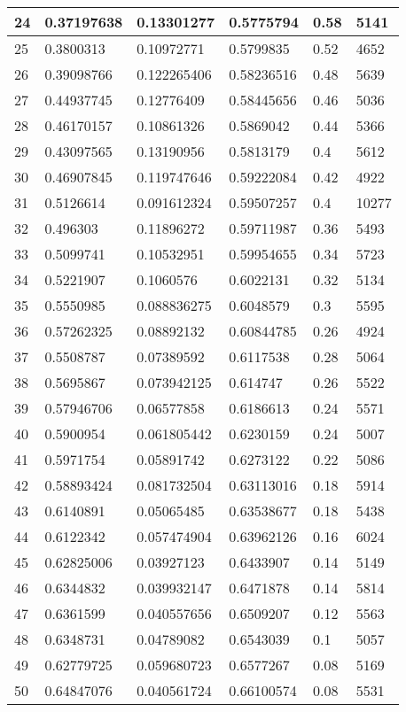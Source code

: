 \begin{longtable}{|l|l|l|l|l|l|}
24 & 0.37197638 & 0.13301277 & 0.5775794 & 0.58 & 5141 \\ \hline 
25 & 0.3800313 & 0.10972771 & 0.5799835 & 0.52 & 4652 \\ \hline 
26 & 0.39098766 & 0.122265406 & 0.58236516 & 0.48 & 5639 \\ \hline 
27 & 0.44937745 & 0.12776409 & 0.58445656 & 0.46 & 5036 \\ \hline 
28 & 0.46170157 & 0.10861326 & 0.5869042 & 0.44 & 5366 \\ \hline 
29 & 0.43097565 & 0.13190956 & 0.5813179 & 0.4 & 5612 \\ \hline 
30 & 0.46907845 & 0.119747646 & 0.59222084 & 0.42 & 4922 \\ \hline 
31 & 0.5126614 & 0.091612324 & 0.59507257 & 0.4 & 10277 \\ \hline 
32 & 0.496303 & 0.11896272 & 0.59711987 & 0.36 & 5493 \\ \hline 
33 & 0.5099741 & 0.10532951 & 0.59954655 & 0.34 & 5723 \\ \hline 
34 & 0.5221907 & 0.1060576 & 0.6022131 & 0.32 & 5134 \\ \hline 
35 & 0.5550985 & 0.088836275 & 0.6048579 & 0.3 & 5595 \\ \hline 
36 & 0.57262325 & 0.08892132 & 0.60844785 & 0.26 & 4924 \\ \hline 
37 & 0.5508787 & 0.07389592 & 0.6117538 & 0.28 & 5064 \\ \hline 
38 & 0.5695867 & 0.073942125 & 0.614747 & 0.26 & 5522 \\ \hline 
39 & 0.57946706 & 0.06577858 & 0.6186613 & 0.24 & 5571 \\ \hline 
40 & 0.5900954 & 0.061805442 & 0.6230159 & 0.24 & 5007 \\ \hline 
41 & 0.5971754 & 0.05891742 & 0.6273122 & 0.22 & 5086 \\ \hline 
42 & 0.58893424 & 0.081732504 & 0.63113016 & 0.18 & 5914 \\ \hline 
43 & 0.6140891 & 0.05065485 & 0.63538677 & 0.18 & 5438 \\ \hline 
44 & 0.6122342 & 0.057474904 & 0.63962126 & 0.16 & 6024 \\ \hline 
45 & 0.62825006 & 0.03927123 & 0.6433907 & 0.14 & 5149 \\ \hline 
46 & 0.6344832 & 0.039932147 & 0.6471878 & 0.14 & 5814 \\ \hline 
47 & 0.6361599 & 0.040557656 & 0.6509207 & 0.12 & 5563 \\ \hline 
48 & 0.6348731 & 0.04789082 & 0.6543039 & 0.1 & 5057 \\ \hline 
49 & 0.62779725 & 0.059680723 & 0.6577267 & 0.08 & 5169 \\ \hline 
50 & 0.64847076 & 0.040561724 & 0.66100574 & 0.08 & 5531 \\ \hline 
\end{longtable}